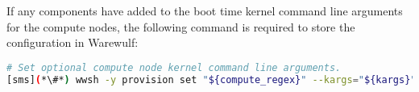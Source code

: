 \noindent If any components have added to the boot time kernel command line arguments for the compute nodes,
the following command is required to store the configuration in Warewulf:
\begin{lstlisting}[language=bash,keywords={},upquote=true,basicstyle=\footnotesize\ttfamily]
# Set optional compute node kernel command line arguments.
[sms](*\#*) wwsh -y provision set "${compute_regex}" --kargs="${kargs}"
\end{lstlisting}
